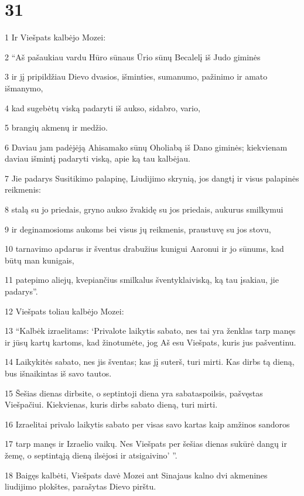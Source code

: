 \chapter{31}


\par 1 Ir Viešpats kalbėjo Mozei: 
\par 2 “Aš pašaukiau vardu Hūro sūnaus Ūrio sūnų Becalelį iš Judo giminės 
\par 3 ir jį pripildžiau Dievo dvasios, išminties, sumanumo, pažinimo ir amato išmanymo, 
\par 4 kad sugebėtų viską padaryti iš aukso, sidabro, vario, 
\par 5 brangių akmenų ir medžio. 
\par 6 Daviau jam padėjėją Ahisamako sūnų Oholiabą iš Dano giminės; kiekvienam daviau išmintį padaryti viską, apie ką tau kalbėjau. 
\par 7 Jie padarys Susitikimo palapinę, Liudijimo skrynią, jos dangtį ir visus palapinės reikmenis: 
\par 8 stalą su jo priedais, gryno aukso žvakidę su jos priedais, aukurus smilkymui 
\par 9 ir deginamosioms aukoms bei visus jų reikmenis, praustuvę su jos stovu, 
\par 10 tarnavimo apdarus ir šventus drabužius kunigui Aaronui ir jo sūnums, kad būtų man kunigais, 
\par 11 patepimo aliejų, kvepiančius smilkalus šventyklai­viską, ką tau įsakiau, jie padarys”. 
\par 12 Viešpats toliau kalbėjo Mozei: 
\par 13 “Kalbėk izraelitams: ‘Privalote laikytis sabato, nes tai yra ženklas tarp manęs ir jūsų kartų kartoms, kad žinotumėte, jog Aš esu Viešpats, kuris jus pašventinu. 
\par 14 Laikykitės sabato, nes jis šventas; kas jį suterš, turi mirti. Kas dirbs tą dieną, bus išnaikintas iš savo tautos. 
\par 15 Šešias dienas dirbsite, o septintoji diena yra sabatas­poilsis, pašvęstas Viešpačiui. Kiekvienas, kuris dirbs sabato dieną, turi mirti. 
\par 16 Izraelitai privalo laikytis sabato per visas savo kartas kaip amžinos sandoros 
\par 17 tarp manęs ir Izraelio vaikų. Nes Viešpats per šešias dienas sukūrė dangų ir žemę, o septintąją dieną ilsėjosi ir atsigaivino’ ”. 
\par 18 Baigęs kalbėti, Viešpats davė Mozei ant Sinajaus kalno dvi akmenines liudijimo plokštes, parašytas Dievo pirštu.



